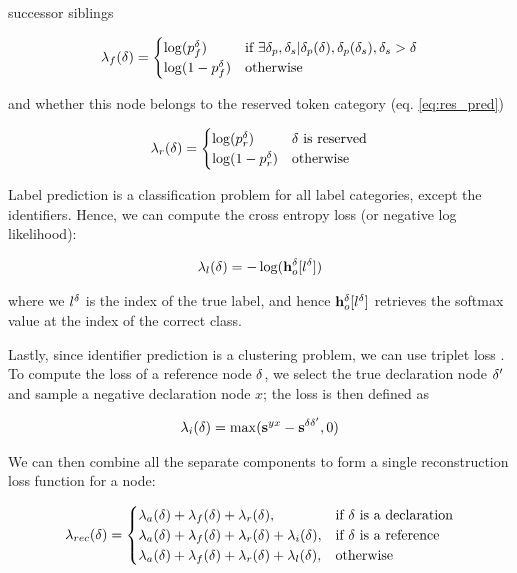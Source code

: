 successor siblings

\begin{align}
    \lambda_{f}(\delta) = \begin{cases}
        \log(p^\delta_f) & \text{if }\exists \delta_p, \delta_s | \delta_p(\delta), \delta_p(\delta_s), \delta_s > \delta \\
        \log(1- p^\delta_f) & \text{otherwise}
    \end{cases}
\end{align}

and whether this node belongs to the reserved token category (eq. \ref{eq:res_pred})

\begin{align}
    \lambda_{r}(\delta) = \begin{cases}
        \log(p^\delta_r)  & \delta \text{ is reserved} \\
        \log(1- p^\delta_r)  & \text{otherwise}
    \end{cases}
\end{align}

Label prediction is a classification problem for all label categories, except the identifiers.
Hence, we can compute the cross entropy loss (or negative log likelihood):

\begin{align}
    \lambda_{l}(\delta) = - \log(\mathbf{h}_o^\delta[l^\delta])
\end{align}

\noindent where we $l^\delta$ is the index of the true label, and hence $\mathbf{h}_o^\delta[l^\delta]$ retrieves the softmax value at the index of the correct class. 

Lastly, since identifier prediction is a clustering problem, we can use triplet loss \cite{chechik2010large}. 
To compute the loss of a reference node $\delta$, we select the true declaration node $\delta'$ and sample a negative declaration node $x$; the loss is then defined as

\begin{align}
    \lambda_i(\delta)=\max(\mathbf{s}^{yx} - \mathbf{s}^{\delta \delta'},0)
\end{align}

\noindent We can then combine all the separate components to form a single reconstruction loss function for a node:

\begin{small}
\begin{align}
   \lambda_{rec}(\delta) = 
\begin{cases}
    \lambda_{a}(\delta) + \lambda_{f}(\delta) + \lambda_{r}(\delta),& \text{if } \delta \text{ is a declaration} \\
    \lambda_{a}(\delta) + \lambda_{f}(\delta) + \lambda_{r}(\delta) + \lambda_{i}(\delta),& \text{if } \delta \text{ is a reference} \\
    \lambda_{a}(\delta) + \lambda_{f}(\delta) + \lambda_{r}(\delta) + \lambda_{l}(\delta),& \text{otherwise}
\end{cases}
\end{align}
\end{small}

